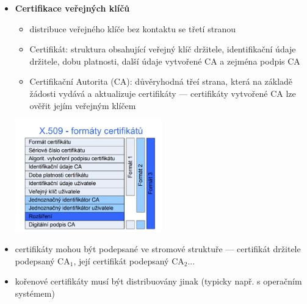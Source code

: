 \begin{itemize}
	\item \textbf{Certifikace veřejných klíčů}
	\begin{itemize}
		\item distribuce veřejného klíče bez kontaktu se třetí stranou
		\item Certifikát: struktura obsahující veřejný klíč držitele, identifikační údaje držitele, dobu platnosti, další údaje vytvořené CA a zejména podpis CA
		\item Certifikační Autorita (CA): důvěryhodná třeí strana, která na základě žádosti vydává a aktualizuje certifikáty --- certifikáty vytvořené CA lze ověřit jejím veřejným klíčem	
	\end{itemize}
	
	\includegraphics[width=0.5\textwidth]{img/SP-9_4.jpg}
	
	\item certifikáty mohou být podepsané ve stromové struktuře --- certifikát držitele podepsaný CA$_1$, její certifikát podepsaný CA$_2$...
	\item kořenové certifikáty musí být distribuovány jinak (typicky např. s operačním systémem)
\end{itemize}